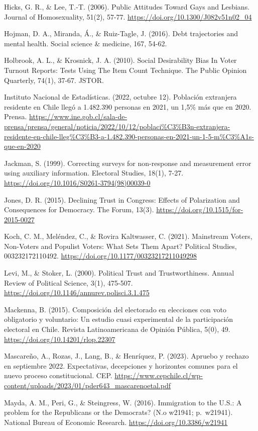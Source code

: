 \documentclass[
  12pt,
]{book}
\begin{document}
Hicks, G. R., \& Lee, T.-T. (2006). Public Attitudes Toward Gays and Lesbians. Journal of Homosexuality, 51(2), 57-77. \url{https://doi.org/10.1300/J082v51n02_04}

Hojman, D. A., Miranda, Á., \& Ruiz-Tagle, J. (2016). Debt trajectories and mental health. Social science \& medicine, 167, 54-62.

Holbrook, A. L., \& Krosnick, J. A. (2010). Social Desirability Bias In Voter Turnout Reports: Tests Using The Item Count Technique. The Public Opinion Quarterly, 74(1), 37-67. JSTOR.

Instituto Nacional de Estadísticas. (2022, octubre 12). Población extranjera residente en Chile llegó a 1.482.390 personas en 2021, un 1,5\% más que en 2020. Prensa. \url{https://www.ine.gob.cl/sala-de-prensa/prensa/general/noticia/2022/10/12/poblaci\%C3\%B3n-extranjera-residente-en-chile-lleg\%C3\%B3-a-1.482.390-personas-en-2021-un-1-5-m\%C3\%A1s-que-en-2020}

Jackman, S. (1999). Correcting surveys for non-response and measurement error using auxiliary information. Electoral Studies, 18(1), 7-27. \url{https://doi.org/10.1016/S0261-3794(98)00039-0}

Jones, D. R. (2015). Declining Trust in Congress: Effects of Polarization and Consequences for Democracy. The Forum, 13(3). \url{https://doi.org/10.1515/for-2015-0027}

Koch, C. M., Meléndez, C., \& Rovira Kaltwasser, C. (2021). Mainstream Voters, Non-Voters and Populist Voters: What Sets Them Apart? Political Studies, 003232172110492. \url{https://doi.org/10.1177/00323217211049298}

Levi, M., \& Stoker, L. (2000). Political Trust and Trustworthiness. Annual Review of Political Science, 3(1), 475-507. \url{https://doi.org/10.1146/annurev.polisci.3.1.475}

Mackenna, B. (2015). Composición del electorado en elecciones con voto obligatorio y voluntario: Un estudio cuasi experimental de la participación electoral en Chile. Revista Latinoamericana de Opinión Pública, 5(0), 49. \url{https://doi.org/10.14201/rlop.22307}

Mascareño, A., Rozas, J., Lang, B., \& Henríquez, P. (2023). Apruebo y rechazo en septiembre 2022. Expectativas, decepciones y horizontes comunes para el nuevo proceso constitucional. CEP. \url{https://www.cepchile.cl/wp-content/uploads/2023/01/pder643_mascarenoetal.pdf}

Mayda, A. M., Peri, G., \& Steingress, W. (2016). Immigration to the U.S.: A problem for the Republicans or the Democrats? (N.o w21941; p.~w21941). National Bureau of Economic Research. \url{https://doi.org/10.3386/w21941}
\end{document}
